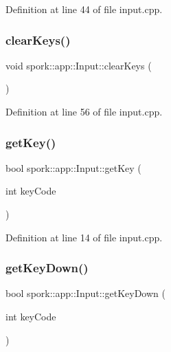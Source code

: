 Definition at line 44 of file input.\+cpp.

\mbox{\label{classspork_1_1app_1_1_input_a422c08ccd18bb23ea7c075e4f79e2d80}} 
\subsubsection{\texorpdfstring{clear\+Keys()}{clearKeys()}}
{\footnotesize\ttfamily void spork\+::app\+::\+Input\+::clear\+Keys (\begin{DoxyParamCaption}{ }\end{DoxyParamCaption})}



Definition at line 56 of file input.\+cpp.

\mbox{\label{classspork_1_1app_1_1_input_a49050175fcca31843c59cbdeb1cfbc88}} 
\subsubsection{\texorpdfstring{get\+Key()}{getKey()}}
{\footnotesize\ttfamily bool spork\+::app\+::\+Input\+::get\+Key (\begin{DoxyParamCaption}\item[{int}]{key\+Code }\end{DoxyParamCaption})}



Definition at line 14 of file input.\+cpp.

\mbox{\label{classspork_1_1app_1_1_input_a5204953f654ba10336f5ab9c61ca314c}} 
\subsubsection{\texorpdfstring{get\+Key\+Down()}{getKeyDown()}}
{\footnotesize\ttfamily bool spork\+::app\+::\+Input\+::get\+Key\+Down (\begin{DoxyParamCaption}\item[{int}]{key\+Code }\end{DoxyParamCaption})}



